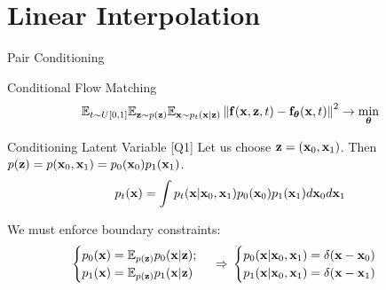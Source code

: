 \documentclass{beamer}
\renewcommand{\eqpause}{}
\renewcommand{\nextonslide}[1]{#1}
\begin{document}
\section{Linear Interpolation}
\begin{frame}{Pair Conditioning}
	\begin{block}{Conditional Flow Matching}
		\vspace{-0.3cm}
		\[
			\mathbb{E}_{t \sim U[0, 1]} \mathbb{E}_{\mathbf{z} \sim p(\mathbf{z})} \mathbb{E}_{\mathbf{x} \sim p_t(\mathbf{x} | \mathbf{z})}\left\| \mathbf{f}(\mathbf{x}, \mathbf{z}, t) - \mathbf{f}_{\boldsymbol{\theta}}(\mathbf{x}, t) \right\|^2 \rightarrow \min_{\boldsymbol{\theta}}
		\]
		\vspace{-0.3cm}
	\end{block}
	\begin{block}{Conditioning Latent Variable [Q1]}
		Let us choose $\mathbf{z} = (\mathbf{x}_0, \mathbf{x}_1)$. Then $p(\mathbf{z}) = p (\mathbf{x}_0, \mathbf{x}_1) = p_0(\mathbf{x}_0) p_1(\mathbf{x}_1)$.
		\[
			p_t(\mathbf{x}) = \int p_t(\mathbf{x} | \mathbf{x}_0, \mathbf{x}_1) p_0(\mathbf{x}_0) p_1(\mathbf{x}_1) d \mathbf{x}_0 d \mathbf{x}_1
		\]
	\end{block}
	\eqpause
	We must enforce boundary constraints:
	\[
		\begin{cases}
			p_0(\bx) = \bbE_{p(\bz)} p_0(\bx | \bz); \\
			p_1(\bx) = \bbE_{p(\bz)} p_1(\bx | \bz)
		\end{cases}
		\, 
		\nextonslide{
			\Rightarrow \, 
			\begin{cases}
				p_0(\bx | \bx_0, \bx_1) = \delta(\bx - \bx_0) \\
				p_1(\bx | \bx_0, \bx_1) = \delta(\bx - \bx_1)
			\end{cases}
		}
	\]
	\vspace{-0.3cm}
\end{frame}
\end{document}
